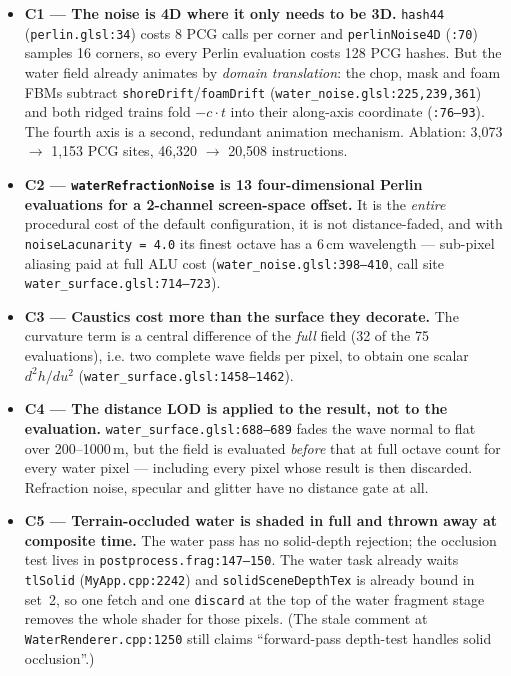 \documentclass[11pt,a4paper]{article}
\begin{document}
\begin{itemize}
    \item \textbf{C1 --- The noise is 4D where it only needs to be 3D.} \texttt{hash44} (\texttt{perlin.glsl:34}) costs 8
    PCG calls per corner and \texttt{perlinNoise4D} (\texttt{:70}) samples 16 corners, so every Perlin evaluation costs
    128 PCG hashes. But the water field already animates by \emph{domain translation}: the chop, mask and foam FBMs
    subtract \texttt{shoreDrift}/\texttt{foamDrift} (\texttt{water\_noise.glsl:225,239,361}) and both ridged trains fold
    $-c\cdot t$ into their along-axis coordinate (\texttt{:76--93}). The fourth axis is a second, redundant animation
    mechanism. Ablation: 3,073 $\rightarrow$ 1,153 PCG sites, 46,320 $\rightarrow$ 20,508 instructions.
    \item \textbf{C2 --- \texttt{waterRefractionNoise} is 13 four-dimensional Perlin evaluations for a 2-channel
    screen-space offset.} It is the \emph{entire} procedural cost of the default configuration, it is not distance-faded,
    and with \texttt{noiseLacunarity = 4.0} its finest octave has a 6\,cm wavelength --- sub-pixel aliasing paid at full
    ALU cost (\texttt{water\_noise.glsl:398--410}, call site \texttt{water\_surface.glsl:714--723}).
    \item \textbf{C3 --- Caustics cost more than the surface they decorate.} The curvature term is a central difference
    of the \emph{full} field (32 of the 75 evaluations), i.e. two complete wave fields per pixel, to obtain one scalar
    $d^2h/du^2$ (\texttt{water\_surface.glsl:1458--1462}).
    \item \textbf{C4 --- The distance LOD is applied to the result, not to the evaluation.} \texttt{water\_surface.glsl:688--689}
    fades the wave normal to flat over 200--1000\,m, but the field is evaluated \emph{before} that at full octave count
    for every water pixel --- including every pixel whose result is then discarded. Refraction noise, specular and
    glitter have no distance gate at all.
    \item \textbf{C5 --- Terrain-occluded water is shaded in full and thrown away at composite time.} The water pass has
    no solid-depth rejection; the occlusion test lives in \texttt{postprocess.frag:147--150}. The water task already waits
    \texttt{tlSolid} (\texttt{MyApp.cpp:2242}) and \texttt{solidSceneDepthTex} is already bound in set~2, so one fetch and
    one \texttt{discard} at the top of the water fragment stage removes the whole shader for those pixels. (The stale
    comment at \texttt{WaterRenderer.cpp:1250} still claims ``forward-pass depth-test handles solid occlusion''.)
\end{itemize}
\end{document}
